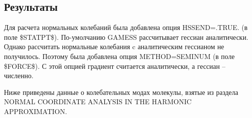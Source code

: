 \subsection{Результаты}
Для расчета нормальных колебаний была добавлена опция HSSEND=.TRUE. (в поле \$STATPT\$). По-умолчанию GAMESS рассчитывает гессиан аналитически. Однако рассчитать нормальные колебания c аналитическим гессианом не получилось. Поэтому была добавлена опция METHOD=SEMINUM (в поле \$FORCE\$). С этой опцией градиент считается аналитически, а гессиан -- численно.

Ниже приведены данные о колебательных модах молекулы, взятые из раздела NORMAL COORDINATE ANALYSIS IN THE HARMONIC APPROXIMATION.
\begin{table}[H]
    \caption{Нормальные колебания молекулы}
    \begin{center}
    \label{tab:my-table}
\end{center}
\end{table}
